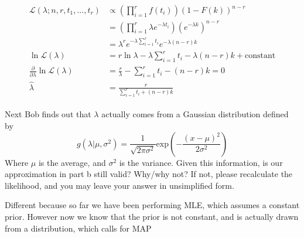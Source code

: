 \begin{Parts}
\begin{solution}
    \begin{align}
        \begin{aligned}
            \mathcal{L}(\lambda; n, r, t_1,...,t_r) &\propto (\prod^r_{i=1}f(t_i))(1 - F(k))^{n-r}\\
            &= (\prod^r_{i=1}\lambda e^{-\lambda t_i})(e^{-\lambda k})^{n-r}\\
            &= \lambda^r e^{-\lambda \sum^r_{i=1} t_i} e^{-\lambda(n-r)k}\\
            \ln \mathcal{L(\lambda)} &= r\ln \lambda - \lambda \sum^r_{i=1}t_i - \lambda(n-r)k + \text{constant}\\
            \frac{\partial}{\partial \lambda} \ln \mathcal{L}(\lambda) &= \frac{r}{\lambda} - \sum^r_{i=1} t_i - (n-r)k = 0\\
            \hat{\lambda} &= \frac{r}{\sum^r_{i=1} t_i + (n-r)k}
        \end{aligned}
    \end{align}
\end{solution}

\Part
Next Bob finds out that $\lambda$ actually comes from a Gaussian distribution defined by $$g(\lambda| \mu, \sigma^2) = \frac{1}{\sqrt{2 \pi \sigma^2}}\text{exp}(-\frac{(x - \mu)^2}{2\sigma ^ 2})$$ Where $\mu$ is the average, and $\sigma^2$ is the variance. Given this information, is our approximation in part b still valid? Why/why not? If not, please recalculate the likelihood, and you may leave your answer in unsimplified form.

\begin{solution}
    Different because so far we have been performing MLE, which assumes a constant prior. However now we know that the prior is not constant, and is actually drawn from a distribution, which calls for MAP\\


\end{solution}
\end{Parts}
